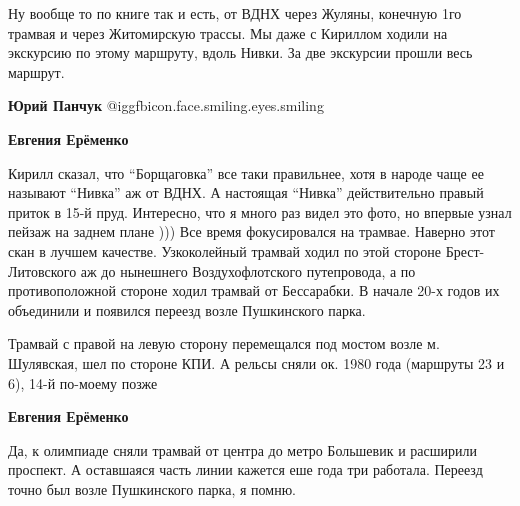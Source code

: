 Ну вообще то по книге так и есть, от ВДНХ через Жуляны, конечную 1го трамвая и
через Житомирскую трассы. Мы даже с Кириллом ходили на экскурсию по этому
маршруту, вдоль Нивки. За две экскурсии прошли весь маршрут.


\textbf{Юрий Панчук}  @igg{fbicon.face.smiling.eyes.smiling} 

\textbf{Евгения Ерёменко}

Кирилл сказал, что \enquote{Борщаговка} все таки правильнее, хотя в народе чаще ее
называют \enquote{Нивка} аж от ВДНХ. А настоящая \enquote{Нивка} действительно правый приток в
15-й пруд. Интересно, что я много раз видел это фото, но впервые узнал пейзаж
на заднем плане ))) Все время фокусировался на трамвае. Наверно этот скан в
лучшем качестве. Узкоколейный трамвай ходил по этой стороне Брест-Литовского аж
до нынешнего Воздухофлотского путепровода, а по противоположной стороне ходил
трамвай от Бессарабки. В начале 20-х годов их объединили и появился переезд
возле Пушкинского парка.


Трамвай с правой на левую сторону перемещался под мостом возле м. Шулявская,
шел по стороне КПИ. А рельсы сняли ок. 1980 года (маршруты 23 и 6), 14-й
по-моему позже

\textbf{Евгения Ерёменко} 

Да, к олимпиаде сняли трамвай от центра до метро Большевик и расширили
проспект. А оставшаяся часть линии кажется еше года три работала. Переезд точно
был возле Пушкинского парка, я помню.
